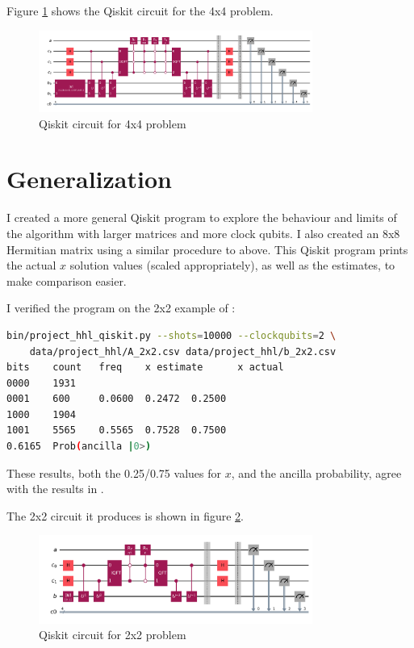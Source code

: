 \documentclass[12pt]{extarticle}
\begin{document}
Figure \ref{fig:hhl_4x4_qiskit} shows the Qiskit circuit for the 4x4 problem.
\begin{figure}[H]
\centering
\includegraphics[width=0.80\textwidth]{images/project_hhl_4x4.png}
\caption{Qiskit circuit for 4x4 problem}
\label{fig:hhl_4x4_qiskit}
\end{figure}

\section{Generalization}\label{sec:generalization}

I created a more general Qiskit program to explore the behaviour and limits of the algorithm with larger matrices and more clock qubits.
I also created an 8x8 Hermitian matrix using a similar procedure to above.
This Qiskit program prints the actual $x$ solution values (scaled appropriately), as well as the estimates, to make comparison easier.

I verified the program on the 2x2 example of \cite{zaman2023step}:
\begin{lstlisting}[language=Bash]
bin/project_hhl_qiskit.py --shots=10000 --clockqubits=2 \
    data/project_hhl/A_2x2.csv data/project_hhl/b_2x2.csv
bits    count   freq    x estimate      x actual
0000    1931
0001    600     0.0600  0.2472  0.2500
1000    1904
1001    5565    0.5565  0.7528  0.7500
0.6165  Prob(ancilla |0>)
\end{lstlisting}

These results, both the 0.25/0.75 values for $x$, and the ancilla probability, agree with the results in \cite{zaman2023step}.

The 2x2 circuit it produces is shown in figure \ref{fig:hhl_2x2_qiskit}.
\begin{figure}[H]
\centering
\includegraphics[width=0.80\textwidth]{images/project_hhl_2x2.png}
\caption{Qiskit circuit for 2x2 problem}
\label{fig:hhl_2x2_qiskit}
\end{figure}
\end{document}
